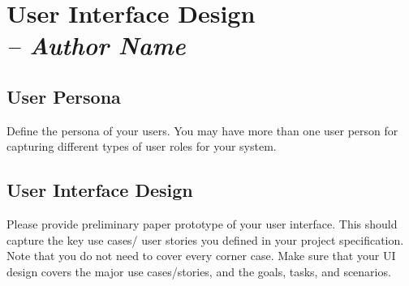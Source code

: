 \chapter{User Interface Design \\
\small{\textit{-- Author Name}}
\label{Chapter::UserInterfaceDesign}}

\section{User Persona}
Define the persona of your users. You may have more than one user person for capturing different types
of user roles for your system.

\section{User Interface Design}
Please provide preliminary paper prototype of your user interface. This should capture the key
use cases/ user stories you defined in your project specification. Note that you do not need to
cover every corner case. Make sure that your UI design covers the major use cases/stories, and
the goals, tasks, and scenarios.